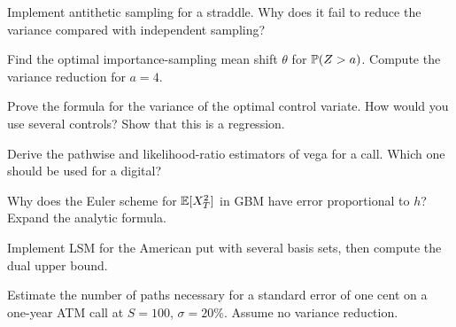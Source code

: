 \begin{exercises}
\item Implement antithetic sampling for a straddle. Why does it fail to reduce the variance compared with independent sampling?
\item Find the optimal importance-sampling mean shift $\theta$ for $\mathbb{P}(Z>a)$. Compute the variance reduction for $a=4$.
\item Prove the formula for the variance of the optimal control variate. How would you use several controls? Show that this is a regression.
\item Derive the pathwise and likelihood-ratio estimators of vega for a call. Which one should be used for a digital?
\item Why does the Euler scheme for $\mathbb{E}[X_T^2]$ in GBM have error proportional to $h$? Expand the analytic formula.
\item Implement LSM for the American put with several basis sets, then compute the dual upper bound.
\item Estimate the number of paths necessary for a standard error of one cent on a one-year ATM call at $S=100$, $\sigma=20\%$. Assume no variance reduction.
\end{exercises}
